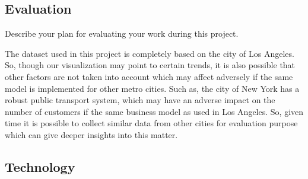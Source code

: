 \subsection{Evaluation}
\label{sec:eval}

Describe your plan for evaluating your work during this project.

The dataset used in this project is completely based on the city of Los Angeles. So, though our visualization may point to certain trends, it is also possible that other factors are not taken into account which may affect adversely if the same model is implemented for other metro cities. Such as, the city of New York has a robust public transport system, which may have an adverse impact on the number of customers if the same business model as used in Los Angeles. So, given time it is possible to collect similar data from other cities for evaluation purpose which can give deeper insights into this matter.




\subsection{Technology}
\label{sec:tech}


